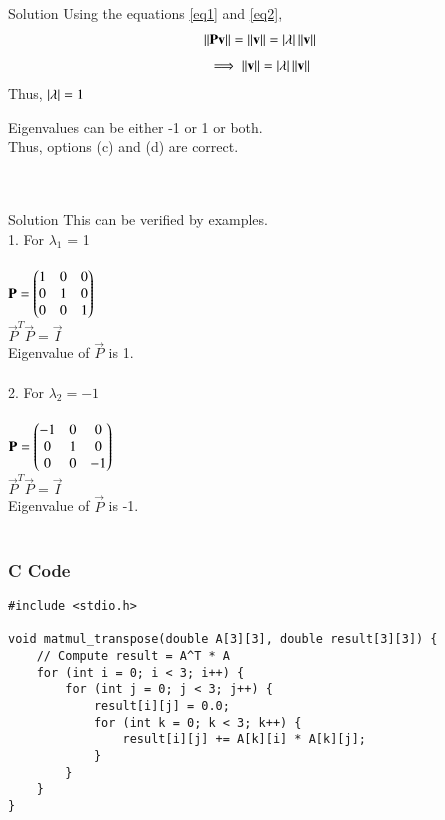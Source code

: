\documentclass{beamer}
\begin{document}
\begin{frame}{Solution}
Using the equations \eqref{eq1} and \eqref{eq2},
\begin{align}
\left\lVert\mathbf{P}\mathbf{v}\right\rVert = \left\lVert\mathbf{v}\right\rVert = \left\vert\lambda\right\vert\left\lVert\mathbf{v}\right\rVert
\end{align}
\begin{align}
\implies \left\lVert\mathbf{v}\right\rVert = \left\vert\lambda\right\vert\left\lVert\mathbf{v}\right\rVert
\end{align}
Thus, $\left\vert\lambda\right\vert = 1$

Eigenvalues can be either -1 or 1 or both. \\

Thus, options (c) and (d) are correct. \\ \\ \\
\end{frame}

\begin{frame}{Solution}
This can be verified by examples.\\ 
1. For $\lambda_1$ = 1 \\ \\
$\mathbf{P} = \begin{pmatrix}1 & 0 & 0 \\ 0 & 1 & 0 \\ 0 & 0 & 1\end{pmatrix}$ \\
$\vec{P}^T\vec{P} = \vec{I}$ \\
Eigenvalue of $\vec{P}$ is 1. \\ \\
2. For $\lambda_2 = -1$ \\ \\
$\mathbf{P} = \begin{pmatrix}-1 & 0 & 0 \\ 0 & 1 & 0 \\ 0 & 0 & -1\end{pmatrix}$ \\
$\vec{P}^T\vec{P} = \vec{I}$ \\
Eigenvalue of $\vec{P}$ is -1. \\ \\
\end{frame}

\begin{frame}[fragile]
    \frametitle{C Code}
    \begin{lstlisting}
#include <stdio.h>

void matmul_transpose(double A[3][3], double result[3][3]) {
    // Compute result = A^T * A
    for (int i = 0; i < 3; i++) {
        for (int j = 0; j < 3; j++) {
            result[i][j] = 0.0;
            for (int k = 0; k < 3; k++) {
                result[i][j] += A[k][i] * A[k][j];
            }
        }
    }
}




    \end{lstlisting}
\end{frame}
\end{document}
